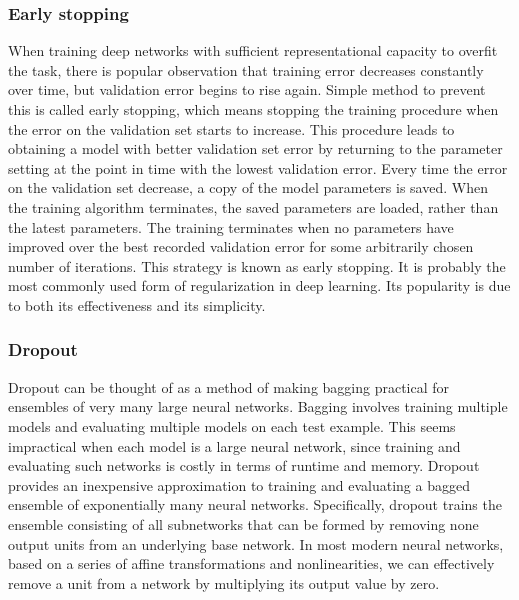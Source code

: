 \documentclass[12pt]{article}
\theoremstyle{definition}
\DeclareRobustCommand{\[}{\begin{equation}}
\DeclareRobustCommand{\]}{\end{equation}}
\begin{document}
        \subsubsection{Early stopping}
            When training deep networks with sufficient representational capacity to overﬁt
            the task, there is popular observation that training error decreases constantly over time, but
            validation error begins to rise again.
            Simple method to prevent this is called early stopping, which means stopping the training procedure when the error on the validation set starts to increase.
            This procedure leads to obtaining a model with better validation set error by returning to the parameter setting at the point in time with the lowest validation error. Every time the error on the validation set
            decrease, a copy of the model parameters is saved. When the training algorithm
            terminates, the saved parameters are loaded, rather than the latest parameters. The
            training terminates when no parameters have improved over the best recorded
            validation error for some arbitrarily chosen number of iterations. 
            This strategy is known as early stopping. It is probably the most commonly
            used form of regularization in deep learning. Its popularity is due to both its
            effectiveness and its simplicity.
            \cite{Goodfellow-et-al-2016}
            
        \subsubsection{Dropout}
            Dropout can be thought of as a method of making bagging practical for ensembles
            of very many large neural networks. Bagging involves training multiple models
            and evaluating multiple models on each test example. This seems impractical
            when each model is a large neural network, since training and evaluating such
            networks is costly in terms of runtime and memory. Dropout provides an inexpensive
            approximation to training and evaluating a bagged ensemble of exponentially many
            neural networks. Speciﬁcally, dropout trains the ensemble consisting of all subnetworks that
            can be formed by removing none output units from an underlying base network.
            In most modern neural networks, based on a series of affine transformations and nonlinearities, we can effectively remove a unit from a network by multiplying its output value by zero.
            \cite{Dropout} \cite{Goodfellow-et-al-2016}
            
\end{document}
